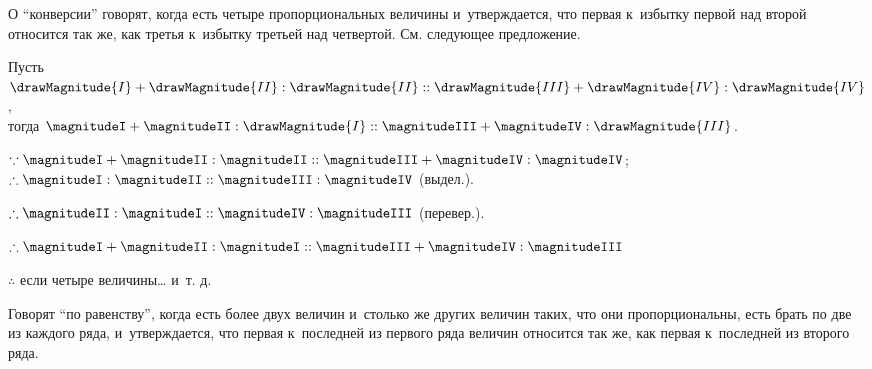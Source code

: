 \documentclass[letters,booklanguage=russian]{byrnebook}
\begin{document}
\label{def:V.XVII} %
О \enquote{конверсии} говорят, когда есть четыре пропорциональных величины и~утверждается, что первая к~избытку первой над второй относится так же, как третья к~избытку третьей над четвертой. См. следующее предложение.

\vfill\pagebreak

\label{prop:V.E}

\begin{center}
Пусть $ \drawMagnitude{I} + \drawMagnitude{II} : \drawMagnitude{II} ::  \drawMagnitude{III} + \drawMagnitude{IV} : \drawMagnitude{IV}$,\\
тогда $\magnitudeI + \magnitudeII : \drawMagnitude{I} :: \magnitudeIII + \magnitudeIV : \drawMagnitude{III}$.

$\because \magnitudeI + \magnitudeII : \magnitudeII :: \magnitudeIII + \magnitudeIV : \magnitudeIV$;\\
$\therefore \magnitudeI : \magnitudeII :: \magnitudeIII : \magnitudeIV$ (выдел.).

$\therefore \magnitudeII : \magnitudeI :: \magnitudeIV : \magnitudeIII$ (перевер.).

$\therefore \magnitudeI + \magnitudeII : \magnitudeI :: \magnitudeIII + \magnitudeIV : \magnitudeIII$

$\therefore$ если четыре величины… и~т. д.
\end{center}

\label{def:V.XVIII}
Говорят \enquote{по равенству}, когда есть более двух величин и~столько же других величин таких, что они пропорциональны, есть брать по две из каждого ряда, и~утверждается, что первая к~последней из первого ряда величин относится так же, как первая к~последней из второго ряда.

\vfill\pagebreak
\end{document}
